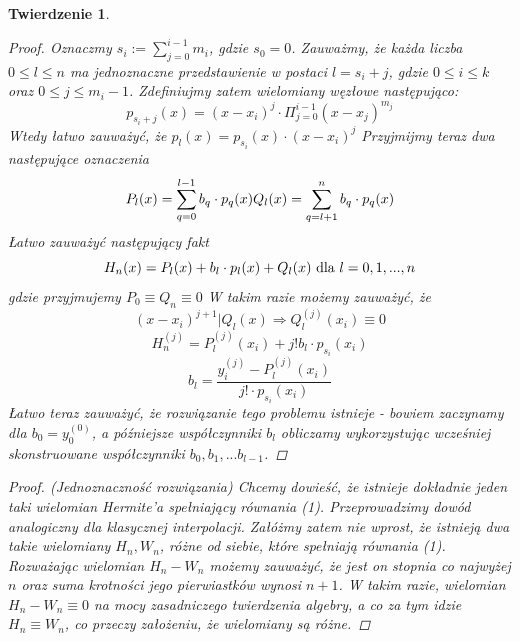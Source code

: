 \documentclass[10pt,wide]{mwart}
\newtheorem{tw}{Twierdzenie}
\theoremstyle{definition}
\begin{document}
\begin{tw}
\begin{proof}
Oznaczmy \(s_i := \sum_{j=0}^{i-1} m_i\), gdzie \(s_0 = 0\). Zauważmy, że każda liczba \(0 \leq l \leq n\) ma jednoznaczne przedstawienie w postaci \(l = s_i + j\),
 gdzie \(0 \leq i \leq k\) oraz \(0 \leq j \leq m_i - 1\).
Zdefiniujmy zatem wielomiany węzłowe następująco:
\begin{equation}
p_{s_i + j}(x) = (x-x_i)^j \cdot \Pi_{j=0}^{i-1}(x - x_j)^{m_j}
\end{equation}
Wtedy łatwo zauważyć, że \(p_{l}(x) = p_{s_i}(x)\cdot (x-x_i)^j \)
Przyjmijmy teraz dwa następujące oznaczenia
\begin{equation}
  P_l(x) = \sum_{q = 0}^{l-1}b_q\cdot p_q(x) \\
  Q_l(x) = \sum_{q = l+1}^{n}b_q\cdot p_q(x)
\end{equation}
Łatwo zauważyć następujący fakt
\begin{equation}
  H_n(x) = P_l(x) + b_l\cdot p_l(x) + Q_l(x) \text{   dla  } l=0,1,...,n \\
\end{equation}
gdzie przyjmujemy \(P_0 \equiv Q_n \equiv 0\)
W takim razie możemy zauważyć, że
\begin{equation}
  (x-x_i)^{j+1} | Q_l(x) \Rightarrow Q_l^{(j)}(x_i) \equiv 0
\end{equation}
\begin{equation}
H_n^{(j)} = P_l^{(j)}(x_i) + j!b_l\cdot p_{s_i}(x_i)
\end{equation}
\begin{equation}
b_l = \frac{y_i^{(j)} - P_l^{(j)}(x_i)}{j!\cdot p_{s_i}(x_i)}
\end{equation}
Łatwo teraz zauważyć, że rozwiązanie tego problemu istnieje - bowiem zaczynamy dla \(b_0 = y_0^{(0)}\),
a późniejsze współczynniki \(b_l\) obliczamy wykorzystując wcześniej skonstruowane współczynniki \(b_0,b_1,...b_{l-1}\).
\end{proof}
\begin{proof} (Jednoznaczność rozwiązania)
  Chcemy dowieść, że istnieje dokładnie jeden taki wielomian Hermite'a spełniający równania (1). Przeprowadzimy dowód analogiczny dla klasycznej interpolacji.
  Załóżmy zatem nie wprost, że istnieją dwa takie wielomiany \(H_n, W_n\), różne od siebie, które spełniają równania (1).
  Rozważając wielomian \(H_n - W_n\) możemy zauważyć, że jest on stopnia co najwyżej \(n\) oraz suma krotności jego pierwiastków wynosi \(n+1\).
  W takim razie, wielomian \(H_n - W_n \equiv 0\) na mocy zasadniczego twierdzenia algebry, a co za tym idzie \(H_n \equiv W_n\), co przeczy założeniu, że wielomiany są różne.
\end{proof}
\end{tw}
\end{document}
